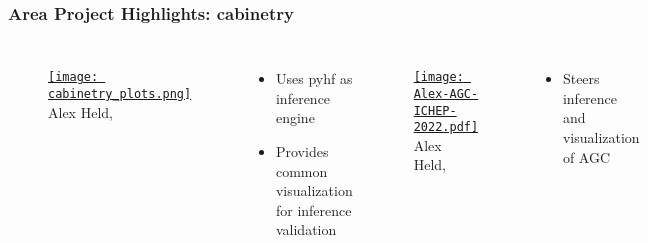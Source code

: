 \begin{frame}
  \frametitle{Area Project Highlights: cabinetry}

  \begin{columns}
    \begin{figure}
        \begin{center}
            \href{https://indico.cern.ch/event/1056428/contributions/4523825/}{\texttt{[image: cabinetry\_plots.png]}}
            Alex Held, 
        \end{center}
    \end{figure}
    \begin{itemize}
      \item Uses pyhf as inference engine
      \item Provides common visualization for inference validation
    \end{itemize}
%
    \begin{figure}
        \begin{center}
            \href{https://agenda.infn.it/event/28874/contributions/169204/}{\texttt{[image: Alex-AGC-ICHEP-2022.pdf]}}
            Alex Held, 
        \end{center}
    \end{figure}
    \begin{itemize}
      \item Steers inference and visualization of AGC
    \end{itemize}
  \end{columns}

\end{frame}

